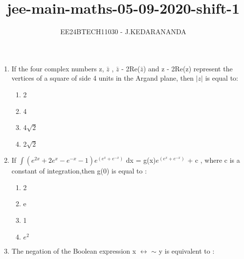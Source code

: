 \documentclass[journal]{IEEEtran}
\renewcommand{\thefigure}{\theenumi}
\renewcommand{\thetable}{\theenumi}
\numberwithin{equation}{enumi}
\numberwithin{figure}{enumi}
\renewcommand{\thetable}{\theenumi}
\begin{document}

\vspace{3cm}

\title{jee-main-maths-05-09-2020-shift-1}
\author{EE24BTECH11030 - J.KEDARANANDA}
{\let\newpage\relax\maketitle}
\renewcommand{\thefigure}{\theenumi}
\renewcommand{\thetable}{\theenumi}
\begin{enumerate}
    \item If the four complex numbers z, $\bar{z}$ , $\bar{z}$ - 2Re($\bar{z}$)  and z - 2Re(z) represent the vertices of a square of side 4 units in the Argand plane, then $|z|$ is equal to: \\ 
    \begin{multicols}{4}
    \begin{enumerate}
        \item 2
        \item 4
        \item 4$\sqrt{2}$
        \item 2$\sqrt{2}$
    \end{enumerate}
    \end{multicols}
    \item If $\int(e^{2x} + 2e^{x} - e^{-x} - 1)e^{(e^x + e^{-x})}$ dx = g(x)$e^{(e^x + e^{-x})}$ + c , where c is a constant of integration,then g(0) is equal to : \\
    \begin{multicols}{4}
    \begin{enumerate}
        \item 2
        \item e
        \item 1
        \item $e^2$
    \end{enumerate} 
    \end{multicols}
    \item The negation of the Boolean expression x $\leftrightarrow$ $\sim$ y  is equivalent to : \\


\end{enumerate}
\end{document}
